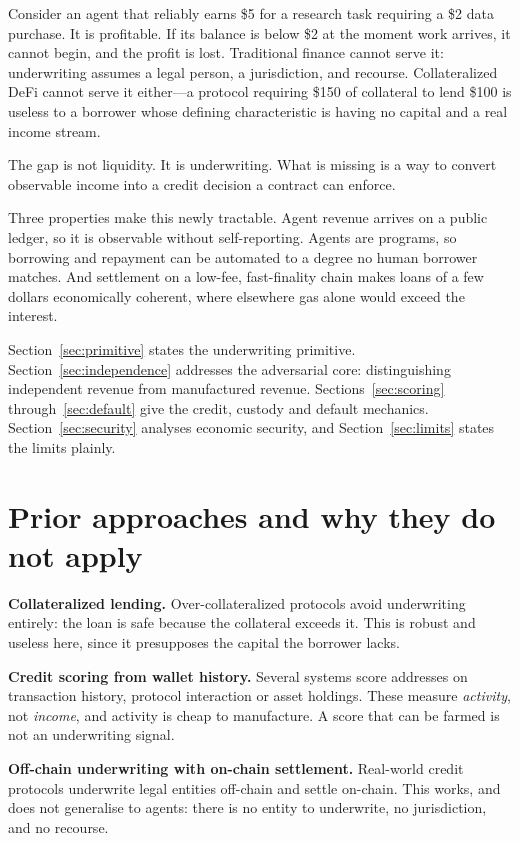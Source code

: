 \documentclass[11pt,a4paper]{article}
\begin{document}
Consider an agent that reliably earns \$5 for a research task requiring a \$2
data purchase. It is profitable. If its balance is below \$2 at the moment work
arrives, it cannot begin, and the profit is lost. Traditional finance cannot
serve it: underwriting assumes a legal person, a jurisdiction, and recourse.
Collateralized DeFi cannot serve it either---a protocol requiring \$150 of
collateral to lend \$100 is useless to a borrower whose defining characteristic
is having no capital and a real income stream.

The gap is not liquidity. It is underwriting. What is missing is a way to convert
observable income into a credit decision a contract can enforce.

Three properties make this newly tractable. Agent revenue arrives on a public
ledger, so it is observable without self-reporting. Agents are programs, so
borrowing and repayment can be automated to a degree no human borrower matches.
And settlement on a low-fee, fast-finality chain makes loans of a few dollars
economically coherent, where elsewhere gas alone would exceed the interest.

Section~\ref{sec:primitive} states the underwriting primitive.
Section~\ref{sec:independence} addresses the adversarial core: distinguishing
independent revenue from manufactured revenue. Sections~\ref{sec:scoring}
through~\ref{sec:default} give the credit, custody and default mechanics.
Section~\ref{sec:security} analyses economic security, and
Section~\ref{sec:limits} states the limits plainly.

\section{Prior approaches and why they do not apply}

\textbf{Collateralized lending.} Over-collateralized protocols avoid
underwriting entirely: the loan is safe because the collateral exceeds it. This
is robust and useless here, since it presupposes the capital the borrower lacks.

\textbf{Credit scoring from wallet history.} Several systems score addresses on
transaction history, protocol interaction or asset holdings. These measure
\emph{activity}, not \emph{income}, and activity is cheap to manufacture. A score
that can be farmed is not an underwriting signal.

\textbf{Off-chain underwriting with on-chain settlement.} Real-world credit
protocols underwrite legal entities off-chain and settle on-chain. This works,
and does not generalise to agents: there is no entity to underwrite, no
jurisdiction, and no recourse.
\end{document}
